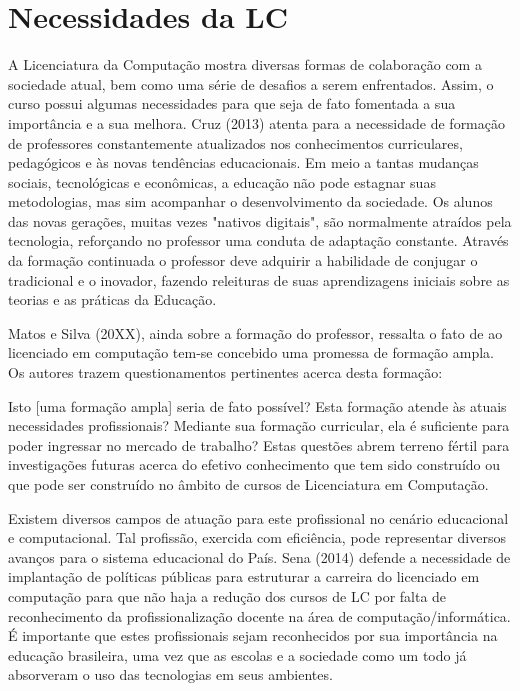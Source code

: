 \section{Necessidades da LC}%
 
	A Licenciatura da Computação mostra diversas formas de colaboração com a sociedade atual, bem como uma série de desafios a serem enfrentados. Assim, o curso possui algumas necessidades para que seja de fato fomentada a sua importância e a sua melhora. Cruz (2013) atenta para a necessidade de  formação de professores constantemente atualizados nos conhecimentos curriculares, pedagógicos e às novas tendências educacionais. Em meio a tantas mudanças sociais, tecnológicas e econômicas, a educação não pode estagnar suas metodologias, mas sim acompanhar o desenvolvimento da sociedade. Os alunos das novas gerações, muitas vezes "nativos digitais", são normalmente atraídos pela tecnologia, reforçando no professor uma conduta de adaptação constante. Através da formação continuada o professor deve adquirir a habilidade de conjugar o tradicional e o inovador, fazendo releituras de suas aprendizagens iniciais sobre as teorias e as práticas da Educação.
	
    
    Matos e Silva (20XX), ainda sobre a formação do professor, ressalta o fato de ao licenciado em computação tem-se concebido uma promessa de formação ampla. Os autores trazem questionamentos pertinentes acerca desta formação: 
 
Isto [uma formação ampla] seria de fato possível? Esta formação atende às atuais necessidades profissionais? Mediante sua formação curricular, ela é suficiente para poder ingressar no mercado de trabalho? Estas questões abrem terreno fértil para investigações futuras acerca do efetivo conhecimento que tem sido construído ou que pode ser construído no âmbito de cursos de Licenciatura em Computação. 
 
	Existem diversos campos de atuação para este profissional no cenário educacional e computacional. Tal profissão, exercida com eficiência, pode representar diversos avanços para o sistema educacional do País. Sena (2014) defende a necessidade de implantação de políticas públicas para estruturar a carreira do licenciado em computação para que não haja a redução dos cursos de LC por falta de reconhecimento da profissionalização docente na área de computação/informática. É importante que estes profissionais sejam reconhecidos por sua importância na educação brasileira, uma vez que as escolas e a sociedade como um todo já absorveram o uso das tecnologias em seus ambientes.
	
